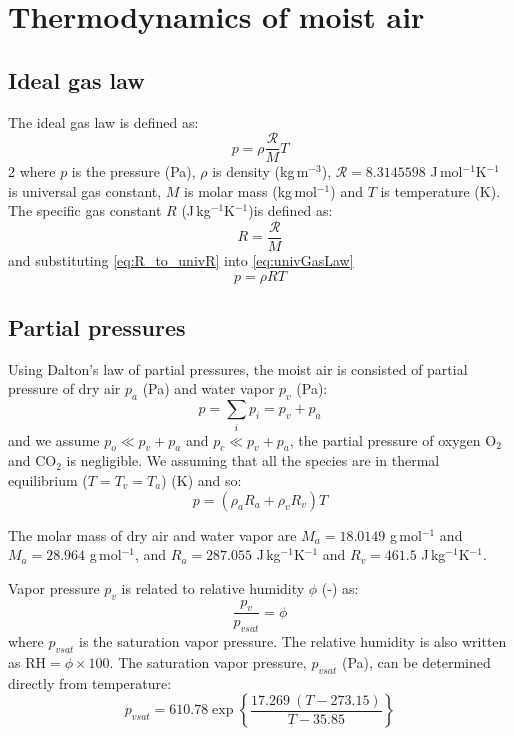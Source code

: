\chapter{Thermodynamics of moist air}
\label{app:thermodynamics}


\section*{Ideal gas law}

The ideal gas law is defined as:
\begin{equation}
p = \rho\frac{\mathcal{R}}{M}T
\label{eq:univGasLaw}
\end{equation}2
where $p$ is the pressure (Pa), $\rho$ is density (kg\,m$^{-3}$), $\mathcal{R}=\num{8.3145598}$ J\,mol$^{-1}$K$^{-1}$ is universal gas constant, $M$ is molar mass (kg\,mol$^{-1}$) and $T$ is temperature (K). The specific gas constant $R$ (J\,kg$^{-1}$K$^{-1}$)is defined as:
\begin{equation}
R = \frac{\mathcal{R}}{M}
\label{eq:R_to_univR}
\end{equation}
and substituting \ref{eq:R_to_univR} into \ref{eq:univGasLaw}
\begin{equation}
p = \rho R T
\label{eq:idealGasLaw}
\end{equation}

\section*{Partial pressures}

Using Dalton's law of partial pressures, the moist air is consisted of partial pressure of dry air $p_a$ (Pa) and water vapor $p_v$ (Pa):
\begin{equation}
p = \sum_i p_i  = p_v + p_a
\label{eq:dalton}
\end{equation}
and we assume $p_o \ll p_v+p_a$ and $p_c\ll p_v + p_a$, the partial pressure of oxygen O$_2$ and CO$_2$ is negligible. We assuming that all the species are in thermal equilibrium ($T = T_v = T_a$) (K) and so:
\begin{equation}
p = \left(\rho_a R_a + \rho_v R_v \right) T
\end{equation}

The molar mass of dry air and water vapor are $M_a = \num{18.0149}$ g\,mol$^{-1}$ and $M_a=\num{28.964}$ g\,mol$^{-1}$, and $R_a = \num{287.055}$ J\,kg$^{-1}$K$^{-1}$ and $R_v = \num{461.5}$ J\,kg$^{-1}$K$^{-1}$.

Vapor pressure $p_v$ is related to relative humidity $\phi$ (-) as:
\begin{equation}
\frac{p_v}{p_{\textit{vsat}}} = \phi
\end{equation}
where $p_{\textit{vsat}}$ is the saturation vapor pressure. The relative humidity is also written as $\textrm{RH}=\phi\times 100$. The saturation vapor pressure, $p_{\textit{vsat}}$ (Pa), can be determined directly from temperature:
\begin{equation}
p_{vsat} = 610.78 \exp \left\{\frac{17.269\ (T - 273.15)}{T - 35.85}\right\}
\end{equation}

